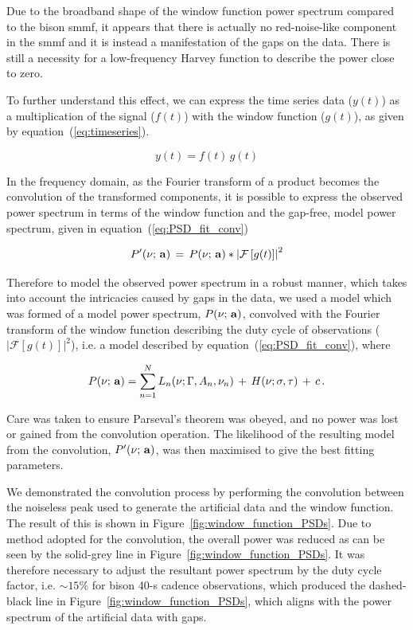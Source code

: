 Due to the broadband shape of the window function power spectrum compared to the \gls{bison} \gls{smmf}, it appears that there is actually no red-noise-like component in the \gls{smmf} and it is instead a manifestation of the gaps on the data. There is still a necessity for a low-frequency Harvey function to describe the power close to zero.

To further understand this effect, we can express the  time series data ($y(t)$) as a multiplication of the signal ($f(t)$) with the window function ($g(t)$), as given by equation~(\ref{eq:timeseries}).

\begin{equation}
y(t)  = f(t) \, g(t)
\label{eq:timeseries}
\end{equation}

In the frequency domain, as the Fourier transform of a product becomes the convolution of the transformed components, it is possible to express the observed power spectrum in terms of the window function and the gap-free, model power spectrum, given in equation~(\ref{eq:PSD_fit_conv})

\begin{equation}
P'(\nu; \,{\bf a}) \, = \, P(\nu; \,{\bf a}) * \left|\mathcal{F}\left[g(t)\right]\right|^2
\label{eq:PSD_fit_conv}
\end{equation}

Therefore to model the observed power spectrum in a robust manner, which takes into account the intricacies caused by gaps in the data, we used a model which was formed of a model power spectrum, $P(\nu; \,{\bf a})$, convolved with the Fourier transform of the window function describing the duty cycle of observations ($\left|\mathcal{F}\left[g(t)\right]\right|^2$), i.e. a model described by equation~(\ref{eq:PSD_fit_conv}), where


\begin{equation}
P(\nu; \,{\bf a}) = \sum_{n=1}^{N} L_n(\nu; \Gamma, A_n, \nu_n) \, + \, H(\nu; \sigma, \tau) \, + \, c \, .
\label{eq:PSD_model}
\end{equation}

Care was taken to ensure Parseval's theorem was obeyed, and no power was lost or gained from the convolution operation. The likelihood of the resulting model from the convolution, $P'(\nu; \,{\bf a})$, was then maximised to give the best fitting parameters.

We demonstrated the convolution process by performing the convolution between the noiseless peak used to generate the artificial data and the window function. The result of this is shown in Figure~\ref{fig:window_function_PSDs}. Due to method adopted for the convolution, the overall power was reduced as can be seen by the solid-grey line in Figure~\ref{fig:window_function_PSDs}. It was therefore necessary to adjust the resultant power spectrum by the duty cycle factor, i.e. $\sim 15\%$ for \gls{bison} 40-s cadence observations, which produced the dashed-black line in Figure~\ref{fig:window_function_PSDs}, which aligns with the power spectrum of the artificial data with gaps.

